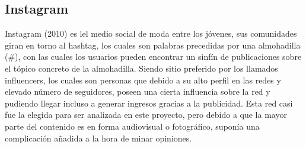 	\subsection{Instagram}
	
	Instagram (2010) es lel medio social de moda entre los jóvenes, sus comunidades giran en torno al hashtag, los cuales son palabras precedidas por una almohadilla (\#), con las cuales los usuarios pueden encontrar un sinfín de publicaciones sobre el tópico concreto de la almohadilla. Siendo sitio preferido por los llamados influencers, los cuales son personas que debido a su alto perfil en las redes y elevado número de seguidores, poseen una cierta influencia sobre la red y pudiendo llegar incluso a generar ingresos gracias a la publicidad. Esta red casi fue la elegida para ser analizada en este proyecto, pero debido a que la mayor parte del contenido es en forma audiovisual o fotográfico, suponía una complicación añadida a la hora de minar opiniones. 
	

	


	
